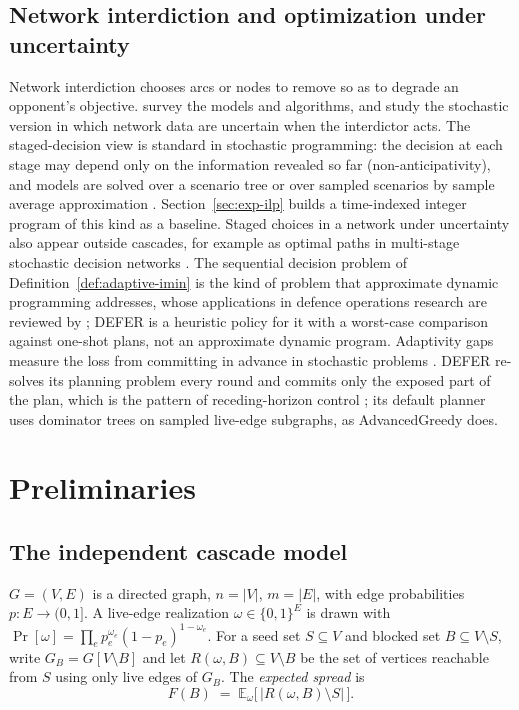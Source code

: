 \documentclass[preprint,11pt]{elsarticle}
\theoremstyle{definition}
\theoremstyle{remark}
\newcommand{\Rspread}{R}
\newcommand{\FF}{F}
\begin{document}
\subsection{Network interdiction and optimization under uncertainty}

Network interdiction chooses arcs or nodes to remove so as to degrade an opponent's objective. \citet{smith2020} survey the models and algorithms, and \citet{cormican1998} study the stochastic version in which network data are uncertain when the interdictor acts. The staged-decision view is standard in stochastic programming: the decision at each stage may depend only on the information revealed so far (non-anticipativity), and models are solved over a scenario tree \citep{birge2011} or over sampled scenarios by sample average approximation \citep{kleywegt2002}. Section~\ref{sec:exp-ilp} builds a time-indexed integer program of this kind as a baseline. Staged choices in a network under uncertainty also appear outside cascades, for example as optimal paths in multi-stage stochastic decision networks \citep{roohnavazfar2019}. The sequential decision problem of Definition~\ref{def:adaptive-imin} is the kind of problem that approximate dynamic programming addresses, whose applications in defence operations research are reviewed by \citet{rempel2021}; DEFER is a heuristic policy for it with a worst-case comparison against one-shot plans, not an approximate dynamic program. Adaptivity gaps measure the loss from committing in advance in stochastic problems \citep{deangoemansvondrak2008,gupta2016}. DEFER re-solves its planning problem every round and commits only the exposed part of the plan, which is the pattern of receding-horizon control \citep{mayne2000}; its default planner uses dominator trees \citep{lengauer1979} on sampled live-edge subgraphs, as AdvancedGreedy does.

\section{Preliminaries}\label{sec:prelim}
\subsection{The independent cascade model}\label{sec:ic-model}

$G=(V,E)$ is a directed graph,
$n=|V|$, $m=|E|$, with edge probabilities $p:E\to(0,1]$. A live-edge
realization $\omega\in\{0,1\}^E$ is drawn with
$\Pr[\omega]=\prod_{e}p_e^{\omega_e}(1-p_e)^{1-\omega_e}$. For a seed set
$S\subseteq V$ and blocked set $B\subseteq V\setminus S$, write
$G_B=G[V\setminus B]$ and let $\Rspread(\omega,B)\subseteq V\setminus B$ be
the set of vertices reachable from $S$ using only live edges of $G_B$. The
\emph{expected spread} is
\begin{equation}\label{eq:spread}
\FF(B)\;=\;\mathbb E_\omega\bigl[\,|\Rspread(\omega,B)\setminus S|\,\bigr].
\end{equation}
\end{document}
